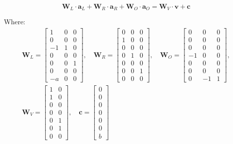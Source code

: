 \documentclass[../lecture-notes-148x210.tex]{subfiles}
\begin{document}
\begin{example}
    \begin{equation*}
    \mathbf{W}_L \cdot \mathbf{a}_L + \mathbf{W}_R \cdot \mathbf{a}_R + \mathbf{W}_O \cdot \mathbf{a}_O = \mathbf{W}_V \cdot \mathbf{v} + \mathbf{c}
    \end{equation*}
    
    Where:
    \begin{align*}
    \mathbf{W}_L = \begin{bmatrix}
        1 & 0 & 0 \\
        0 & 0 & 0 \\
        -1 & 1 & 0 \\
        0 & 0 & 0 \\
        0 & 0 & 1 \\
        0 & 0 & 0 \\
        -a & 0 & 0
    \end{bmatrix},\quad
    \mathbf{W}_R = \begin{bmatrix}
        0 & 0 & 0 \\
        1 & 0 & 0 \\
        0 & 0 & 0 \\
        0 & 1 & 0 \\
        0 & 0 & 0 \\
        0 & 0 & 1 \\
        0 & 0 & 0
    \end{bmatrix},\quad
    \mathbf{W}_O = \begin{bmatrix}
        0 & 0 & 0 \\
        0 & 0 & 0 \\
        0 & 0 & 0 \\
        -1 & 0 & 0 \\
        0 & 0 & 0 \\
        0 & 0 & 0 \\
        0 & -1 & 1
    \end{bmatrix},\\
    \mathbf{W}_V = \begin{bmatrix}
        1 & 0 \\
        1 & 0 \\
        0 & 0 \\
        0 & 0 \\
        0 & 1 \\
        0 & 1 \\
        0 & 0
    \end{bmatrix},\quad
    \mathbf{c} = \begin{bmatrix}
        0 \\ 0 \\ 0 \\ 0 \\ 0 \\ 0 \\ b
    \end{bmatrix}
\end{align*}
    




\end{example}
\end{document}
